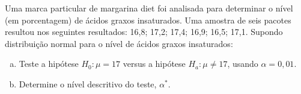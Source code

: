 %
%


\begin{exercicioBanco}[\valorquestao]
    Uma marca particular de margarina diet foi analisada para determinar o nível (em porcentagem) de ácidos graxos insaturados. Uma amostra de seis pacotes resultou nos seguintes resultados: 16,8; 17,2; 17,4; 16,9; 16,5; 17,1. Supondo distribuição normal para o nível de ácidos graxos insaturados:
    \begin{enumerate}[(a)]
        \item Teste a hipótese \(H_{0}: \mu = 17\) versus a hipótese \(H_{a}: \mu \neq 17\), usando \(\alpha = 0,01\).
        \item Determine o nível descritivo do teste, \(\alpha^{\ast}\).
    \end{enumerate}
\end{exercicioBanco}

